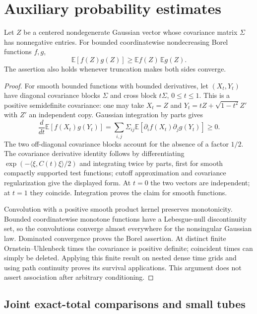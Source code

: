 \section{Auxiliary probability estimates}\label{app:probability}

\begin{lemma}\label{pr:association}
Let $Z$ be a centered nondegenerate Gaussian vector whose covariance
matrix $\Sigma$ has nonnegative entries. For bounded coordinatewise
nondecreasing Borel functions $f,g$,
\[
 \mathbb E[f(Z)g(Z)]\ge\mathbb Ef(Z)\,\mathbb Eg(Z).
\]
The assertion also holds whenever truncation makes both sides converge.
\end{lemma}
\begin{proof}
For smooth bounded functions with bounded derivatives, let $(X_t,Y_t)$
have diagonal covariance blocks $\Sigma$ and cross block $t\Sigma$,
$0\le t\le1$. This is a positive semidefinite covariance: one may take
$X_t=Z$ and $Y_t=tZ+\sqrt{1-t^2}Z'$ with $Z'$ an independent copy.
Gaussian integration by parts gives
\[
 \frac d{dt}\mathbb E[f(X_t)g(Y_t)]
 =\sum_{i,j}\Sigma_{ij}
       \mathbb E[\partial_i f(X_t)\partial_jg(Y_t)]\ge0.
\]
The two off-diagonal covariance blocks account for the absence of a
factor $1/2$. The covariance derivative identity follows by
differentiating $\exp(-\langle\xi,C(t)\xi\rangle/2)$ and integrating
twice by parts, first for smooth compactly supported test functions;
cutoff approximation and covariance regularization give the displayed
form. At $t=0$ the two vectors are independent; at $t=1$ they coincide.
Integration proves the claim for smooth functions.

Convolution with a positive smooth product kernel preserves
monotonicity. Bounded coordinatewise monotone functions have a
Lebesgue-null discontinuity set, so the convolutions converge almost
everywhere for the nonsingular Gaussian law. Dominated convergence
proves the Borel assertion. At distinct finite Ornstein--Uhlenbeck
times the covariance is positive definite; coincident times can simply
be deleted. Applying this finite result on nested dense time grids and
using path continuity proves its survival applications. This argument
does not assert association after arbitrary conditioning.
\end{proof}

\subsection{Joint exact-total comparisons and small tubes}

